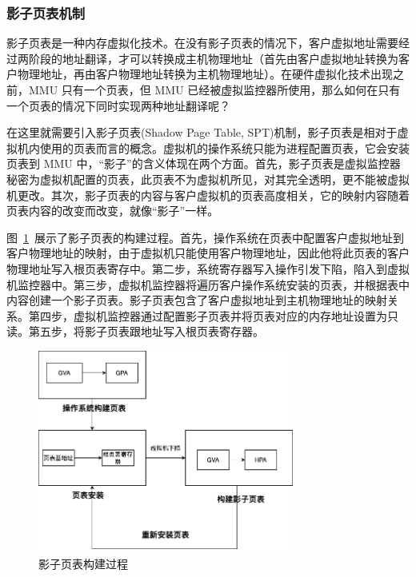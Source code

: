 \subsubsection{影子页表机制}
影子页表是一种内存虚拟化技术。在没有影子页表的情况下，客户虚拟地址需要经过两阶段的地址翻译，才可以转换成主机物理地址（首先由客户虚拟地址转换为客户物理地址，再由客户物理地址转换为主机物理地址）。在硬件虚拟化技术出现之前，MMU 只有一个页表，但 MMU 已经被虚拟监控器所使用，那么如何在只有一个页表的情况下同时实现两种地址翻译呢？

在这里就需要引入影子页表(Shadow Page Table, SPT)机制，影子页表是相对于虚拟机内使用的页表而言的概念。虚拟机的操作系统只能为进程配置页表，它会安装页表到 MMU 中，“影子”的含义体现在两个方面。首先，影子页表是虚拟监控器秘密为虚拟机配置的页表，此页表不为虚拟机所见，对其完全透明，更不能被虚拟机更改。其次，影子页表的内容与客户虚拟机的页表高度相关，它的映射内容随着页表内容的改变而改变，就像“影子”一样。\cite{陈海波2019现代操作系统}

图~\ref{fig:spt}~展示了影子页表的构建过程。首先，操作系统在页表中配置客户虚拟地址到客户物理地址的映射，由于虚拟机只能使用客户物理地址，因此他将此页表的客户物理地址写入根页表寄存中。第二步，系统寄存器写入操作引发下陷，陷入到虚拟机监控器中。第三步，虚拟机监控器将遍历客户操作系统安装的页表，并根据表中内容创建一个影子页表。影子页表包含了客户虚拟地址到主机物理地址的映射关系。第四步，虚拟机监控器通过配置影子页表并将页表对应的内存地址设置为只读。第五步，将影子页表跟地址写入根页表寄存器。\cite{陈海波2019现代操作系统}

\begin{figure}[]
    \centering
    \includegraphics[width=0.75\textwidth]{thesis-images/spt.png}
    \caption{影子页表构建过程}\label{fig:spt}
\end{figure}

